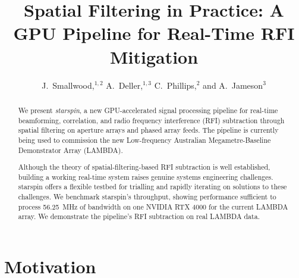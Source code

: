 \documentclass[11pt,twoside]{article}
\begin{document}
\title{Spatial Filtering in Practice: A GPU Pipeline for Real-Time RFI Mitigation}
\author{J.~Smallwood,$^{1,2}$ A.~Deller,$^{1,3}$ C.~Phillips,$^2$ and A.~Jameson$^3$}



\begin{abstract}
\begingroup\setlength{\emergencystretch}{1em}
We present \textit{starspin}, a new GPU-accelerated signal processing pipeline for real-time
beamforming, correlation, and radio frequency interference (RFI) subtraction
through spatial filtering on aperture arrays and phased array
feeds. The pipeline is currently being used to commission the new Low-frequency Australian Megametre-Baseline Demonstrator
Array (LAMBDA).

Although the theory of spatial-filtering-based RFI subtraction is well established,
building a working real-time system raises genuine systems engineering
challenges. starspin offers a flexible testbed for trialling and rapidly iterating on solutions to these challenges.
We benchmark starspin's throughput, showing
performance sufficient to process 56.25~MHz of bandwidth on one NVIDIA RTX 4000
for the current LAMBDA array. We demonstrate the pipeline's RFI subtraction on real LAMBDA
data.
\endgroup
\end{abstract}

\section{Motivation}
\end{document}
